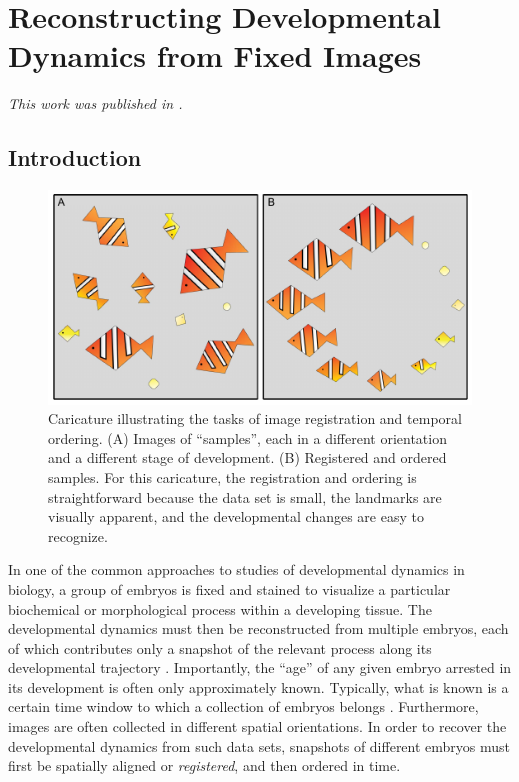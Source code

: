 
\chapter{Reconstructing Developmental Dynamics from Fixed Images \label{ch:drosophila}}

\graphicspath{{ch-drosophila/figures/}}

{\em This work was published in \citep{dsilva2015temporal}.}

\section{Introduction}

\begin{figure}[t]
\centering
\includegraphics{fig1}
\caption[Caricature illustrating the tasks of image registration and temporal ordering]{Caricature illustrating the tasks of image registration and temporal ordering. (A) Images of ``samples'', each in a different orientation and a different stage of development. (B) Registered and ordered samples. For this caricature, the registration and ordering is straightforward because the data set is small, the landmarks are visually apparent, and the developmental changes are easy to recognize.}
\label{fig:fish}
\end{figure}

In one of the common approaches to studies of developmental dynamics in biology, a group of embryos is fixed and stained to visualize a particular biochemical or morphological process within a developing tissue.
%
The developmental dynamics must then be reconstructed from multiple embryos, each of which contributes only a snapshot of the relevant process along its developmental trajectory \citep{jaeger2004dynamic, peter2011gene, fowlkes2008quantitative}.
%
Importantly, the ``age'' of any given embryo arrested in its development is often only approximately known.
%
Typically, what is known is
a certain time window to which a collection of embryos belongs \citep{ng2012large, richardson2014emage, castro2009automatic}.
%
Furthermore, images are often collected in different spatial orientations.
%
In order to recover the developmental dynamics from such data sets, snapshots of different embryos must first be spatially aligned or {\em registered}, and then ordered in time.



